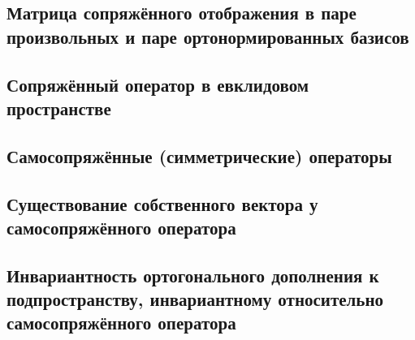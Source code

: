 \subsection{Матрица сопряжённого отображения в паре произвольных и паре ортонормированных базисов}
\subsection{Сопряжённый оператор в евклидовом пространстве}
\subsection{Самосопряжённые (симметрические) операторы}
\subsection{Существование собственного вектора у самосопряжённого оператора}
\subsection{Инвариантность ортогонального дополнения к подпространству, инвариантному относительно самосопряжённого оператора}

